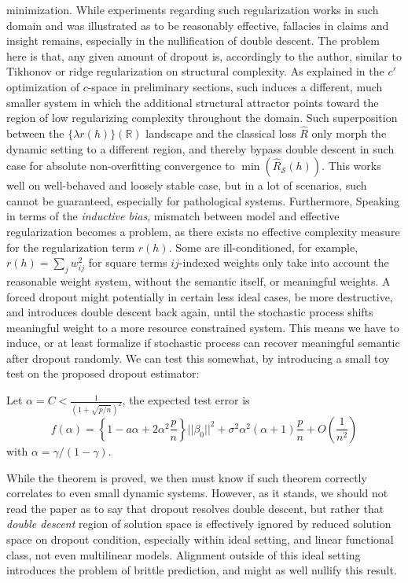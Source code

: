 minimization. While experiments regarding such regularization works in such domain and was illustrated as to be reasonably effective, fallacies in claims and insight remains, especially in the nullification of double descent. The problem here is that, any given amount of dropout is, accordingly to the author, similar to Tikhonov or ridge regularization on structural complexity. As explained in the $c'$ optimization of $c$-space in preliminary sections, such induces a different, much smaller system in which the additional structural attractor points toward the region of low regularizing complexity throughout the domain. Such superposition between the $\{\lambda r(h)\}(\mathbb{R})$ landscape and the classical loss $\hat{R}$ only morph the dynamic setting to a different region, and thereby bypass double descent in such case for absolute non-overfitting convergence to $\min{(\hat{R}_{\mathcal{S}}(h))}$. This works well on well-behaved and loosely stable case, but in a lot of scenarios, such cannot be guaranteed, especially for pathological systems. Furthermore, Speaking in terms of the \textit{inductive bias}, mismatch between model and effective regularization becomes a problem, as there exists no effective complexity measure for the regularization term $r(h)$. Some are ill-conditioned, for example, $r(h)=\sum_{j}w_{ij}^{2}$ for square terms $ij$-indexed weights only take into account the reasonable weight system, without the semantic itself, or meaningful weights. A forced dropout might potentially in certain less ideal cases, be more destructive, and introduces double descent back again, until the stochastic process shifts meaningful weight to a more resource constrained system. This means we have to induce, or at least formalize if stochastic process can recover meaningful semantic after dropout randomly. We can test this somewhat, by introducing a small toy test on the proposed dropout estimator: 
\begin{theorem}
    Let $\alpha = C< \frac{1}{(1+\sqrt{p/n})^2}$, the expected test error is \begin{equation}
        f(\alpha) = \left\{ 1- a\alpha + 2\alpha^2 \frac{p}{n} \right\} ||\beta_{0}||^2 + \sigma^2 \alpha^2 (\alpha + 1)\frac{p}{n} + O\left(\frac{1}{n^2}\right)
    \end{equation}
    with $\alpha=\gamma/(1-\gamma)$.
\end{theorem}
While the theorem is proved, we then must know if such theorem correctly correlates to even small dynamic systems. However, as it stands, we should not read the paper as to say that dropout resolves double descent, but rather that \textit{double descent} region of solution space is effectively ignored by reduced solution space on dropout condition, especially within ideal setting, and linear functional class, not even multilinear models. Alignment outside of this ideal setting introduces the problem of brittle prediction, and might as well nullify this result. 



